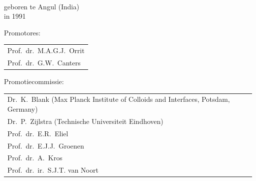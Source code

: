 \begin{titlepage}
\begin{center}
\makeatletter
{\Large\titlefont\bfseries\@firstname\ {\titleshape\@lastname}}
\makeatother

\bigskip
\bigskip


geboren te Angul (India) \\
in 1991

\vspace*{2\bigskipamount}

\end{center}

\clearpage
\thispagestyle{empty}

\noindent Promotores:

\medskip\noindent
\begin{tabular}{l}
    Prof.\ dr.\ M.A.G.J.\ Orrit \\
    Prof.\ dr.\ G.W.\ Canters
\end{tabular}


\medskip
\noindent Promotiecommissie:

\medskip\noindent
\begin{tabular}{ll}
    Dr.\ K.\ Blank (Max Planck Institute of Colloids and Interfaces, Potsdam, Germany) \\
    Dr.\ P.\ Zijlstra (Technische Universiteit Eindhoven) \\
    Prof.\ dr.\ E.R.\ Eliel \\
    Prof.\ dr.\ E.J.J.\ Groenen \\
    Prof.\ dr.\ A.\ Kros \\
    Prof.\ dr.\ ir.\ S.J.T. van Noort \\
\end{tabular}



\end{titlepage}

